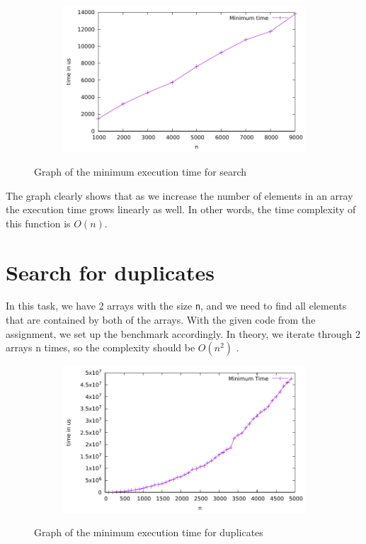 \documentclass[a4paper,11pt]{article}
\begin{document}
\begin{figure}[H]
  \centering
  \begin{subfigure}[b]{.5\textwidth}
    \centering
    \includegraphics[width=\textwidth]{./search/data} %
  \end{subfigure}
  \caption{Graph of the minimum execution time for search}
  \label{fig:graph_4}
\end{figure}
The graph clearly shows that as we increase the number of elements in an array the execution time grows linearly as well.
In other words, the time complexity of this function is $O(n)$.

\section*{Search for duplicates}

In this task, we have 2 arrays with the size {\tt n}, and we need to find all elements that are contained by both of the arrays.
With the given code from the assignment, we set up the benchmark accordingly.
In theory, we iterate through 2 arrays n times, so the complexity should be $O(n^2)$ .

\begin{figure}[H]
  \centering
  \begin{subfigure}[b]{.5\textwidth}
    \centering
    \includegraphics[width=\textwidth]{./duplicates/data} %
  \end{subfigure}
  \caption{Graph of the minimum execution time for duplicates}
  \label{fig:graph_5}
\end{figure}
\end{document}
